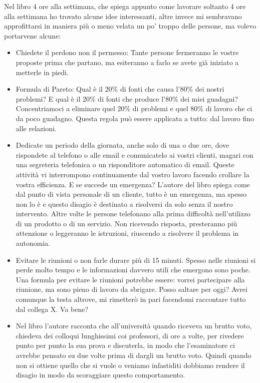 \documentclass[12pt]{book} %
\begin{document}
\begin{mdframed}[linewidth=1pt]
Nel libro 4 ore alla settimana, che spiega appunto come lavorare soltanto
4 ore alla settimana ho trovato alcune idee interessanti, altre invece mi sembravano approfittarsi in maniera più o
meno velata un po' troppo delle persone, ma volevo portarvene alcune:

\begin{itemize}
\item Chiedete il perdono non il permesso: Tante persone fermeranno le vostre proposte prima che partano, ma esiteranno
a farlo se avete già iniziato a metterle in piedi.
\item Formula di Pareto: Qual è il 20\% di fonti che causa l'80\% dei nostri problemi? E qual è il
20\% di fonti che produce l'80\% dei miei guadagni? Concentriamoci a eliminare quel 20\% di
problemi e quel 80\% di lavoro che ci da poco guadagno. Questa regola può essere applicata a tutto: dal lavoro fino
alle relazioni.
\item Dedicate un periodo della giornata, anche solo di una o due ore, dove rispondete al telefono o alle email e
comunicatelo ai vostri clienti, magari con una segreteria telefonica o un risponditore automatico di email. Queste
attività vi interrompono continuamente dal vostro lavoro facendo crollare la vostra efficienza. E se succede un
emergenza? L'autore del libro spiega come dal punto di vista personale di un cliente, tutto è un
emergenza, ma spesso non lo è e questo disagio è destinato a risolversi da solo senza il nostro intervento. Altre volte
le persone telefonano alla prima difficoltà nell'utilizzo di un prodotto o di un servizio. Non
ricevendo risposta, presteranno più attenzione o leggeranno le istruzioni, riuscendo a risolvere il problema in
autonomia.
\item Evitare le riunioni o non farle durare più di 15 minuti. Spesso nelle riunioni si perde molto tempo e le
informazioni davvero utili che emergono sono poche. Una formula per evitare le riunioni potrebbe essere: vorrei
partecipare alla riunione, ma sono pieno di lavoro da sbrigare. Posso saltare per oggi? Avrei comunque la testa
altrove, mi rimetterò in pari facendomi raccontare tutto dal collega X. Va bene?
\item Nel libro l'autore racconta che all'università quando riceveva un brutto voto, chiedeva dei colloqui lunghissimi
coi professori, di ore a volte, per rivedere punto per punto la sua prova e discuterla, in modo che l'esaminatore ci
avrebbe pensato su due volte prima di dargli un brutto voto. Quindi quando non si ottiene quello che si vuole o veniamo
infastiditi dobbiamo rendere il disagio in modo da scoraggiare questo comportamento.
\end{itemize}
\end{mdframed}
\end{document}
